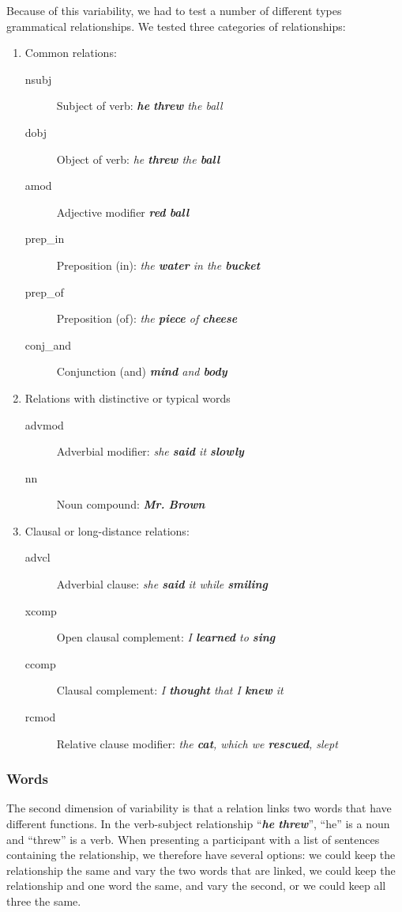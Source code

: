 \documentclass{sigchi}
\begin{document}
Because of this variability, we had to test a number of different types grammatical relationships. We tested three categories of relationships:
\begin{enumerate}
	\item Common relations:
		\begin{description}
			\item[nsubj] Subject of verb: \emph{\textbf{he} \textbf{threw} the ball}
			\item [dobj] Object of verb:  \emph{ he \textbf{threw} the \textbf{ball}}
			\item [amod] Adjective modifier \emph{\textbf{red} \textbf{ball}}
			\item [prep\_in]  Preposition (in): \emph{ the \textbf{water} in the \textbf{bucket}}
			\item [prep\_of]	Preposition (of):  \emph{ the \textbf{piece} of \textbf{cheese}}
			\item [conj\_and]  Conjunction (and)  \emph{ \textbf{mind} and \textbf{body}}
		\end{description} 
	\item Relations with distinctive or typical words
		\begin{description}
		\item[advmod] Adverbial modifier: \emph{  she \textbf{said} it \textbf{slowly}}
		\item [nn] Noun compound:  \emph{ \textbf{Mr.}  \textbf{Brown}}
		\end{description} 
	\item Clausal or long-distance relations:
		\begin{description}
			\item[advcl] Adverbial clause: \emph{  she \textbf{said} it while \textbf{smiling}}
			\item [xcomp] Open clausal complement:  \emph{I \textbf{learned} to \textbf{sing} }
			\item [ccomp] Clausal complement:  \emph{ I \textbf{thought} that I \textbf{knew} it}
			\item [rcmod] Relative clause modifier:  \emph{the \textbf{cat}, which we \textbf{rescued}, slept }
		\end{description} 
	
\end{enumerate}

\subsubsection{Words}
The second dimension of variability is that a relation links two words that have different functions. In the verb-subject relationship ``\emph{\textbf{he} \textbf{threw}}'', ``he'' is a noun and ``threw'' is a verb. When presenting a participant with a list of sentences containing the relationship, we therefore have several options: we could keep the relationship the same and vary the two words that are linked,  we could keep the relationship and one word the same, and vary the second, or we could keep all three the same. 
\end{document}
